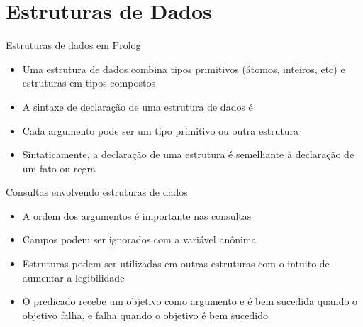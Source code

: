 \section{Estruturas de Dados}

\begin{frame}[fragile]{Estruturas de dados em Prolog}

    \begin{itemize}
        \item Uma estrutura de dados combina tipos primitivos (átomos, inteiros, etc) e 
            estruturas em tipos compostos

        \item A sintaxe de declaração de uma estrutura de dados é 


        \item Cada argumento pode ser um tipo primitivo ou outra estrutura

        \item Sintaticamente, a declaração de uma estrutura é semelhante à declaração de um 
            fato ou regra


   \end{itemize}

\end{frame}

\begin{frame}[fragile]{Consultas envolvendo estruturas de dados}

    \begin{itemize}
        \item A ordem dos argumentos é importante nas consultas


        \item Campos podem ser ignorados com a variável anônima

        \item Estruturas podem ser utilizadas em outras estruturas com o intuito de aumentar a 
            legibilidade


        \item O predicado  recebe um objetivo como argumento e é bem 
            sucedida quando o objetivo falha, e falha quando o objetivo é bem sucedido

    \end{itemize}

\end{frame}
